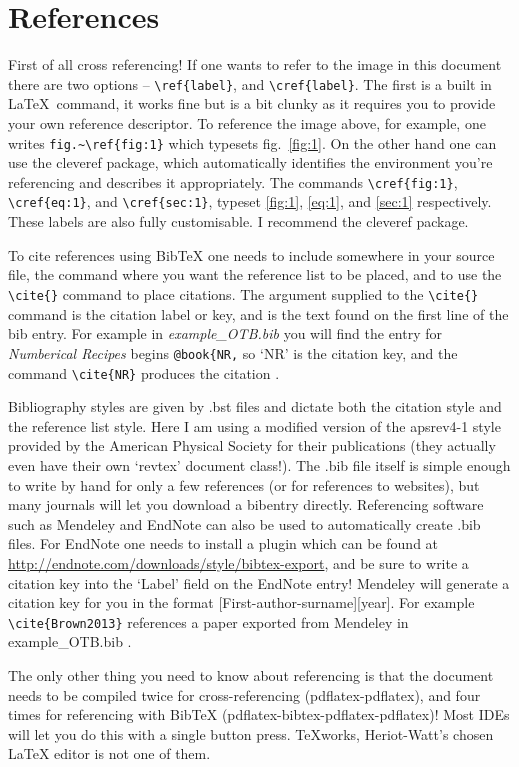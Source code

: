 \documentclass[a4paper,11pt,twoside]{article}		%
\begin{document}
\section{References}
\label{sec:4}
First of all cross referencing! If one wants to refer to the image in this document there are two options -- \verb:\ref{label}:, and \verb:\cref{label}:. The first is a built in \LaTeX\ command, it works fine but is a bit clunky as it requires you to provide your own reference descriptor. To reference the image above, for example, one writes \verb;fig.~\ref{fig:1}; which typesets fig.~\ref{fig:1}. On the other hand one can use the cleveref package, which automatically identifies the environment you're referencing and describes it appropriately. The commands \verb;\cref{fig:1};, \verb;\cref{eq:1};, and \verb;\cref{sec:1};, typeset \cref{fig:1}, \cref{eq:1}, and \cref{sec:1} respectively. These labels are also fully customisable. I recommend the cleveref package.

To cite references using BibTeX one needs to include \verb:: somewhere in your source file, the command \verb:: where you want the reference list to be placed, and to use the \verb:\cite{}: command to place citations. The argument supplied to the \verb:\cite{}: command is the citation label or key, and is the text found on the first line of the bib entry. For example in \emph{example\_OTB.bib} you will find the entry for \emph{Numberical Recipes} begins \verb:@book{NR,: so `NR' is the citation key, and the command \verb:\cite{NR}: produces the citation \cite{NR}.

Bibliography styles are given by .bst files and dictate both the citation style and the reference list style. Here I am using a modified version of the apsrev4-1 style provided by the American Physical Society for their publications (they actually even have their own `revtex' document class!). The .bib file itself is simple enough to write by hand for only a few references (or for references to websites), but many journals will let you download a bibentry directly. Referencing software such as Mendeley and EndNote can also be used to automatically create .bib files. For EndNote one needs to install a plugin which can be found at \url{http://endnote.com/downloads/style/bibtex-export}, and be sure to write a citation key into the `Label' field on the EndNote entry! Mendeley will generate a citation key for you in the format [First-author-surname][year]. For example \verb:\cite{Brown2013}: references a paper exported from Mendeley in example\_OTB.bib \cite{Brown2013}.  

The only other thing you need to know about referencing is that the document needs to be compiled twice for cross-referencing (pdflatex-pdflatex), and four times for referencing with BibTeX (pdflatex-bibtex-pdflatex-pdflatex)! Most IDEs will let you do this with a single button press. TeXworks,  Heriot-Watt's chosen LaTeX editor is not one of them.



\end{document}
